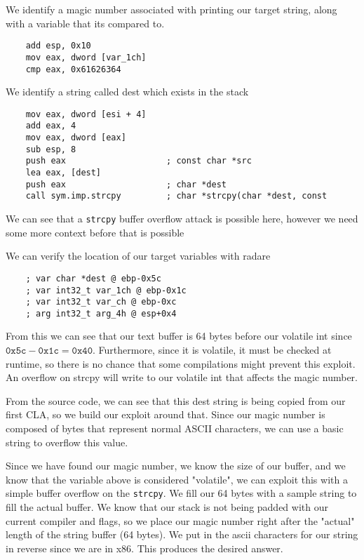 \documentclass[11pt]{article}
\begin{document}
We identify a magic number associated with printing our target string, along with a variable that its compared to.
\begin{lstlisting}
    add esp, 0x10
    mov eax, dword [var_1ch]
    cmp eax, 0x61626364
\end{lstlisting}

We identify a string called dest which exists in the stack
\begin{lstlisting}       
    mov eax, dword [esi + 4]
    add eax, 4
    mov eax, dword [eax]
    sub esp, 8
    push eax                    ; const char *src
    lea eax, [dest]
    push eax                    ; char *dest
    call sym.imp.strcpy         ; char *strcpy(char *dest, const 
\end{lstlisting}

We can see that a \texttt{strcpy} buffer overflow attack is possible here, however we need some more context before that is possible

We can verify the location of our target variables with radare 
\begin{lstlisting}
    ; var char *dest @ ebp-0x5c
    ; var int32_t var_1ch @ ebp-0x1c
    ; var int32_t var_ch @ ebp-0xc
    ; arg int32_t arg_4h @ esp+0x4
\end{lstlisting}

From this we can see that our text buffer is 64 bytes before our volatile int since $\texttt{0x5c} - \texttt{0x1c} =  \texttt{0x40}$. Furthermore, since it is volatile, it must be checked at runtime, so there is no chance that some compilations might prevent this exploit. An overflow on strcpy will write to our volatile int that affects the magic number.

From the source code, we can see that this dest string is being copied from our first CLA, so we build our exploit around that. Since our magic number is composed of bytes that represent normal ASCII characters, we can use a basic string to overflow this value.

Since we have found our magic number, we know the size of our buffer, and we know that the variable above is considered "volatile", we can exploit this with a simple buffer overflow on the \texttt{strcpy}. We fill our 64 bytes with a sample string to fill the actual buffer. We know that our stack is not being padded with our current compiler and flags, so we place our magic number right after the "actual" length of the string buffer (64 bytes). We put in the ascii characters for our string in reverse since we are in x86. This produces the desired answer.
\end{document}
